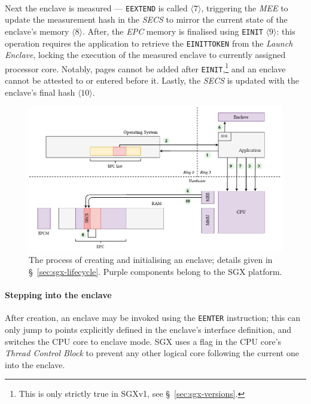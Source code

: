 \paragraph{} Next the enclave is measured --- \texttt{EEXTEND} is called $\langle 7 \rangle$, triggering the \textit{MEE} to update the measurement hash in the \textit{SECS} to mirror the current state of the enclave's memory $\langle 8 \rangle$. After, the \textit{EPC} memory is finalised using \texttt{EINIT} $\langle 9 \rangle$: this operation requires the application to retrieve the \texttt{EINITTOKEN} from the \textit{Launch Enclave}, locking the execution of the measured enclave to currently assigned processor core. Notably, pages cannot be added after \texttt{EINIT},\footnote{This is only strictly true in SGXv1, see §~\ref{sec:sgx-versions}.} and an enclave cannot be attested to or entered before it. Lastly, the \textit{SECS} is updated with the enclave's final hash $\langle 10 \rangle$.


\begin{figure}[]
    \centering
    \includegraphics[width=\linewidth]{figures/SGX-EnclaveCreate.pdf}
    \captionsetup{justification=centering}
    \caption[The process of creating and initialising an enclave.]{The process of creating and initialising an enclave; details given in §~\ref{sec:sgx-lifecycle}. Purple components belong to the SGX platform.}
    \label{fig:sgx-enclavecreate}
\end{figure}

\paragraph{Stepping into the enclave} After creation, an enclave may be invoked using the \texttt{EENTER} instruction; this can only jump to points explicitly defined in the enclave's interface definition, and switches the CPU core to enclave mode. SGX uses a flag in the CPU core's \textit{Thread Control Block} to prevent any other logical core following the current one into the enclave.

